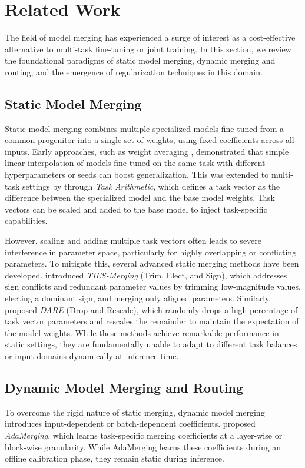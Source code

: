 \section{Related Work}
\label{sec:related_work}

The field of model merging has experienced a surge of interest as a cost-effective alternative to multi-task fine-tuning or joint training. In this section, we review the foundational paradigms of static model merging, dynamic merging and routing, and the emergence of regularization techniques in this domain.

\subsection{Static Model Merging}
Static model merging combines multiple specialized models fine-tuned from a common progenitor into a single set of weights, using fixed coefficients across all inputs. Early approaches, such as weight averaging \cite{wortsman2022robust}, demonstrated that simple linear interpolation of models fine-tuned on the same task with different hyperparameters or seeds can boost generalization. This was extended to multi-task settings by \citet{ilharco2022editing} through \emph{Task Arithmetic}, which defines a task vector as the difference between the specialized model and the base model weights. Task vectors can be scaled and added to the base model to inject task-specific capabilities. 

However, scaling and adding multiple task vectors often leads to severe interference in parameter space, particularly for highly overlapping or conflicting parameters. To mitigate this, several advanced static merging methods have been developed. \citet{tiesmerging} introduced \emph{TIES-Merging} (Trim, Elect, and Sign), which addresses sign conflicts and redundant parameter values by trimming low-magnitude values, electing a dominant sign, and merging only aligned parameters. Similarly, \citet{yu2024dare} proposed \emph{DARE} (Drop and Rescale), which randomly drops a high percentage of task vector parameters and rescales the remainder to maintain the expectation of the model weights. While these methods achieve remarkable performance in static settings, they are fundamentally unable to adapt to different task balances or input domains dynamically at inference time.

\subsection{Dynamic Model Merging and Routing}
To overcome the rigid nature of static merging, dynamic model merging introduces input-dependent or batch-dependent coefficients. \citet{adamerging} proposed \emph{AdaMerging}, which learns task-specific merging coefficients at a layer-wise or block-wise granularity. While AdaMerging learns these coefficients during an offline calibration phase, they remain static during inference. 

